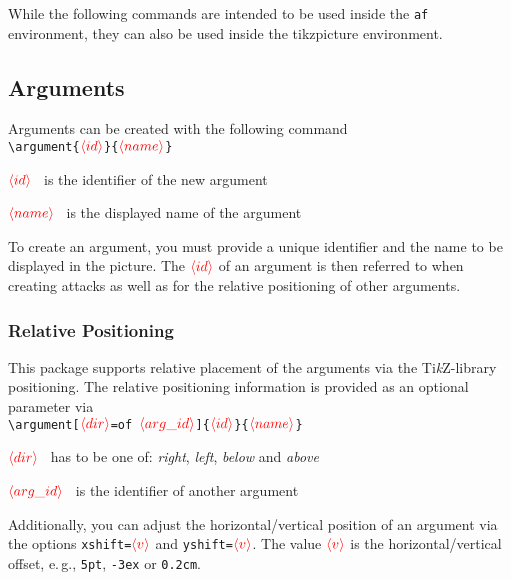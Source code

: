 \documentclass{article}
\newcommand{\tikzname}{Ti\emph{k}Z\xspace}
\newcommand{\opt}[2][red]{\ensuremath{\textcolor{#1}{\langle #2\rangle}}}
\begin{document}
While the following commands are intended to be used inside the \texttt{af} environment, they can also be used inside the \textsf{tikzpicture} environment.

\subsection{Arguments}
    Arguments can be created with the following command\\

    \noindent
    \verb|\argument{|\opt{id}\verb|}{|\opt{name}\verb|}|
    
    \begin{list}{}{\leftmargin=\parindent\rightmargin=0pt}
        \item\opt{id}~ is the identifier of the new argument
        \item\opt{name}~ is the displayed name of the argument
        \item To create an argument, you must provide a unique identifier and the name to be displayed in the picture.
        The \opt{id} of an argument is then referred to when creating attacks as well as for the relative positioning of other arguments.

    \end{list}

\subsubsection{Relative Positioning}    
    This package supports relative placement of the arguments via the \tikzname-library \textsf{positioning}.
    The relative positioning information is provided as an optional parameter via\\

    \noindent
    \verb|\argument[|\opt{dir}\verb|=of |\opt{arg\_id}\verb|]{|\opt{id}\verb|}{|\opt{name}\verb|}|
    
    \begin{list}{}{\leftmargin=\parindent\rightmargin=0pt}
        \item\opt{dir}~ has to be one of: \emph{right}, \emph{left}, \emph{below} and \emph{above} 
        \item\opt{arg\_id}~ is the identifier of another argument
        \item Additionally, you can adjust the horizontal/vertical position of an argument via the options \verb|xshift=|\opt{v} and \verb|yshift=|\opt{v}.
        The value \opt{v} is the horizontal/vertical offset, e.\,g., \verb|5pt|, \verb|-3ex| or \verb|0.2cm|.
    \end{list}
\end{document}

